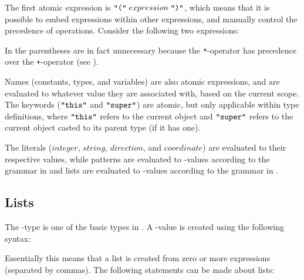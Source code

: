 \begin{ebnf}
\end{ebnf}

The first atomic expression is $\texttt{"("} \; expression \; \texttt{")"}$, which means
that it is possible to embed expressions within other expressions, and manually control
the precedence of operations. Consider the following two expressions:


In  the parentheses are in fact unnecessary because the
\texttt{*}-operator has precedence over the \texttt{+}-operator (see
).

Names (constants, types, and variables) are also atomic expressions, and are evaluated
to whatever value they are associated with, based on the current scope. The keywords
($\texttt{"this"}$ and $\texttt{"super"}$) are atomic, but only applicable within type
definitions, where $\texttt{"this"}$ refers to the current object and $\texttt{"super"}$
refers to the current object casted to its parent type (if it has one).

The literals ($integer$, $string$, $direction$, and $coordinate$) are evaluated to their
respective values, while patterns are evaluated to -values according to
the grammar in  and lists are evaluated to -values
according to the grammar in .

\subsection{Lists}
\label{sec:lists}

The -type is one of the basic types in \productname{}. A -value is
created using the following syntax:

\begin{ebnf}
\end{ebnf}

Essentially this means that a list is created from zero or more expressions (separated
by commas). The following statements can be made about lists:

